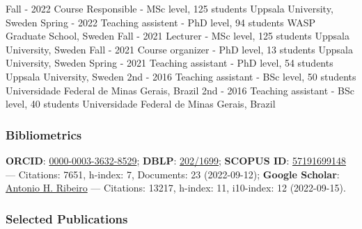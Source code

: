 \documentclass[10pt,letterpaper]{article} %
\begin{document}
    { Fall - 2022  }
    { Course Responsible  - MSc level, 125 students }
    { Uppsala University, Sweden  }
    {}
    { Spring - 2022  }
    { Teaching assistent  - PhD level, 94 students }
    { WASP Graduate School, Sweden  }
    {}
    { Fall - 2021  }
    { Lecturer  - MSc level, 125 students }
    { Uppsala University, Sweden  }
    {}
    { Fall - 2021  }
    { Course organizer  - PhD level, 13 students }
    { Uppsala University, Sweden  }
    {}
    { Spring - 2021  }
    { Teaching assistant  - PhD level, 54 students }
    { Uppsala University, Sweden  }
    {}
    { 2nd - 2016  }
    { Teaching assistant  - BSc level, 50 students }
    { Universidade Federal de Minas Gerais, Brazil  }
    {}
    { 2nd - 2016  }
    { Teaching assistant  - BSc level, 40 students }
    { Universidade Federal de Minas Gerais, Brazil  }
    {}



\subsubsection*{Bibliometrics}

    \footnotesize
{\bf ORCID}:  \href{https://orcid.org/0000-0003-3632-8529}{0000-0003-3632-8529};
{\bf DBLP}: \href{https://dblp.org/pid/202/1699.html}{202/1699};
{\bf SCOPUS ID}: \href{https://www.scopus.com/authid/detail.uri?authorId=57191699148}{57191699148} ---
    Citations: 7651, h-index: 7, Documents: 23  (2022-09-12);
{\bf Google Scholar}: \href{https://scholar.google.com.br/citations?user=5t_sZdMAAAAJ}{Antonio H. Ribeiro} ---
    Citations: 13217, h-index: 11, i10-index: 12 (2022-09-15).



\subsubsection*{Selected Publications}
\scriptsize
\begin{refsection}
    \renewcommand*{\bibfont}{\normalfont\small}
    
            \nocite{ ribeiro_automatic_2020a}
    
            \nocite{ lima_deep_2021}
    
            \nocite{ ribeiro_smoothness_2020}
    
            \nocite{ ribeiro_exploding_2020}
    
            \nocite{ ribeiro_parallel_2018}
    
      \printbibliography[omitnumbers=true,heading=none]
\end{refsection}
\end{document}
